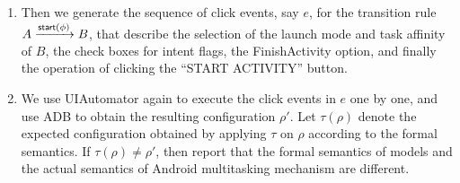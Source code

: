 {\begin{enumerate}
\item Then we generate the sequence of click events, say $e$, for the transition rule $A \xrightarrow{{\mathsf{start} }(\phi)} B$, that describe the selection of the launch mode and task affinity of $B$, the check boxes for intent flags, the FinishActivity option, and finally the operation of clicking the ``START ACTIVITY'' button.  
%
%
\item We use UIAutomator again to execute the click events in $e$ one by one, and use ADB to obtain the resulting configuration $\rho'$. Let $\tau(\rho)$ denote the expected configuration obtained by applying $\tau$ on $\rho$ according to the formal semantics. If $\tau(\rho) \neq \rho'$, then report that the formal semantics of {\AMASS} models and the actual semantics of Android multitasking mechanism are different. 
\end{enumerate}
}





